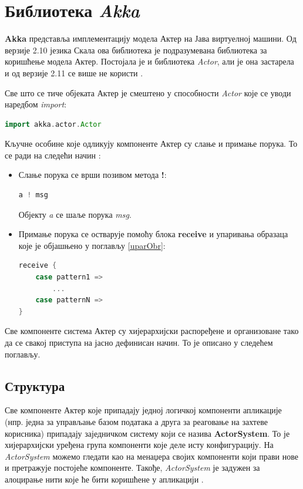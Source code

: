 \documentclass[12pt,oneside]{memoir}
\begin{document}
\section{Библиотека \textit{Akka}}
\label{sec:akka}

\textbf{Akka} представља имплементацију модела Актер на Јава виртуелној машини. Од верзије 2.10 језика Скала ова библиотека је подразумевана библиотека за коришћење модела Актер. Постојала је и библиотека \textit{Actor}, али је она застарела и од верзије 2.11 се више не користи \cite{akkaMarius}.

Све што се тиче објеката Актер је смештено у способности \textit{Actor} које се уводи наредбом \textit{import}:
\begin{lstlisting}[language=Scala]
import akka.actor.Actor
\end{lstlisting}

Кључне особине које одликују компоненте Актер су слање и примање порука. То се ради на следећи начин \cite{progInScala3}: 
\begin{itemize}
\item Слање порука се врши позивом метода \textbf{!}:
\begin{lstlisting}[language=Scala]
a ! msg
\end{lstlisting}
Објекту \textit{a} се шаље порука \textit{msg}.
\item Примање порука се остварује помоћу блока \textbf{receive} и упаривања образаца које је објашњено у поглављу \ref{uparObr}:
\begin{lstlisting}[language=Scala]
receive {
	case pattern1 => 
		...
	case patternN => 
}
\end{lstlisting}
\end{itemize}

Све компоненте система Актер су хијерархијски распоређене и организоване тако да се свакој приступа на јасно дефинисан начин. То је описано у следећем поглављу.

\subsection{Структура}
\label{subsec:struktura}

Све компоненте Актер које припадају једној логичкој компоненти апликације (нпр. једна за управљање базом података а друга за реаговање на захтеве корисника) припадају заједничком систему који се назива \textbf{ActorSystem}. То је хијерархијски уређена група компоненти које деле исту конфигурацију. На \textit{ActorSystem} можемо гледати као на менаџера својих компоненти који прави нове и претражује постојеће компоненте. Такође, \textit{ActorSystem} је задужен за алоцирање нити које ће бити коришћене у апликацији \cite{progInScala3, akkaDoc}.
\end{document}
